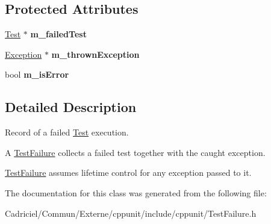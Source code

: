 \subsection*{Protected Attributes}
\begin{DoxyCompactItemize}
\item 
\hyperlink{class_test}{Test} $\ast$ {\bfseries m\+\_\+failed\+Test}\hypertarget{class_test_failure_a2ba79089909967b45aedc4992b51553a}{}\label{class_test_failure_a2ba79089909967b45aedc4992b51553a}

\item 
\hyperlink{class_exception}{Exception} $\ast$ {\bfseries m\+\_\+thrown\+Exception}\hypertarget{class_test_failure_a96bfae3c1f32d0c1729501d68016f431}{}\label{class_test_failure_a96bfae3c1f32d0c1729501d68016f431}

\item 
bool {\bfseries m\+\_\+is\+Error}\hypertarget{class_test_failure_abf258e5bec289b51fb13147a62b8b75d}{}\label{class_test_failure_abf258e5bec289b51fb13147a62b8b75d}

\end{DoxyCompactItemize}


\subsection{Detailed Description}
Record of a failed \hyperlink{class_test}{Test} execution.

A \hyperlink{class_test_failure}{Test\+Failure} collects a failed test together with the caught exception. 

\hyperlink{class_test_failure}{Test\+Failure} assumes lifetime control for any exception passed to it. 

The documentation for this class was generated from the following file\+:\begin{DoxyCompactItemize}
\item 
Cadriciel/\+Commun/\+Externe/cppunit/include/cppunit/Test\+Failure.\+h\end{DoxyCompactItemize}
